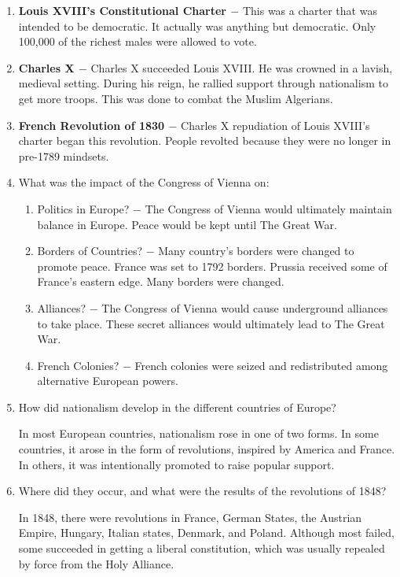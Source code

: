 \documentclass[12pt]{article}
\begin{document}
\begin{enumerate}
\item \textbf{Louis XVIII's Constitutional Charter $-$} This was a charter that was intended to be democratic. It actually was anything but democratic. Only 100,000 of the richest males were allowed to vote.

\item \textbf{Charles X $-$} Charles X succeeded Louis XVIII. He was crowned in a lavish, medieval setting. During his reign, he rallied support through nationalism to get more troops. This was done to combat the Muslim Algerians.

\item \textbf{French Revolution of 1830 $-$} Charles X repudiation of Louis XVIII's charter began this revolution. People revolted because they were no longer in pre-1789 mindsets.

\item What was the impact of the Congress of Vienna on:

\begin{enumerate}[label=(\alph*)]

\item Politics in Europe? $-$ The Congress of Vienna would ultimately maintain balance in Europe. Peace would be kept until The Great War.

\item Borders of Countries? $-$ Many country's borders were changed to promote peace. France was set to 1792 borders. Prussia received some of France's eastern edge. Many borders were changed.

\item Alliances? $-$ The Congress of Vienna would cause underground alliances to take place. These secret alliances would ultimately lead to The Great War.

\item French Colonies? $-$ French colonies were seized and redistributed among alternative European powers.

\end{enumerate}

\item How did nationalism develop in the different countries of Europe?

\begin{center}
In most European countries, nationalism rose in one of two forms. In some countries, it arose in the form of revolutions, inspired by America and France. In others, it was intentionally promoted to raise popular support.
\end{center}

\item Where did they occur, and what were the results of the revolutions of 1848?

\begin{center}
In 1848, there were revolutions in France, German States, the Austrian Empire, Hungary, Italian states, Denmark, and Poland. Although most failed, some succeeded in getting a liberal constitution, which was usually repealed by force from the Holy Alliance.
\end{center}



 

\end{enumerate}
\end{document}
